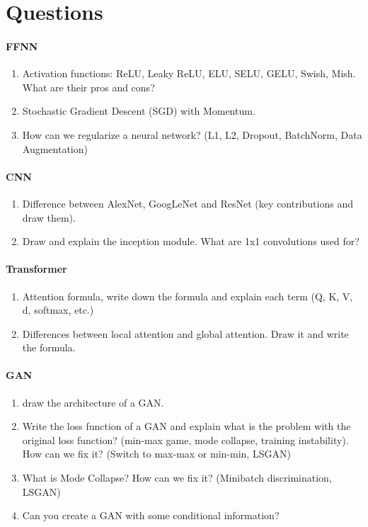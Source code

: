 \section{Questions}

\paragraph{FFNN}
\begin{enumerate}
    \item Activation functions: ReLU, Leaky ReLU, ELU, SELU, GELU, Swish, Mish. What are their pros and cons?
    \item Stochastic Gradient Descent (SGD) with Momentum.
    \item How can we regularize a neural network? (L1, L2, Dropout, BatchNorm, Data Augmentation)
\end{enumerate}

\paragraph{CNN}
\begin{enumerate}
    \item Difference between AlexNet, GoogLeNet and ResNet (key contributions and draw them).
    \item Draw and explain the inception module. What are 1x1 convolutions used for?
\end{enumerate}

\paragraph{Transformer}
\begin{enumerate}
    \item Attention formula, write down the formula and explain each term (Q, K, V, d, softmax, etc.)
    \item Differences between local attention and global attention. Draw it and write the formula.
\end{enumerate}

\paragraph{GAN}
\begin{enumerate}
    \item draw the architecture of a GAN.
    \item Write the loss function of a GAN and explain what is the problem with the original loss function? (min-max game, mode collapse, training instability).
    How can we fix it? (Switch to max-max or min-min, LSGAN)
    \item What is Mode Collapse? How can we fix it? (Minibatch discrimination, LSGAN)
    \item Can you create a GAN with some conditional information? 
\end{enumerate}
